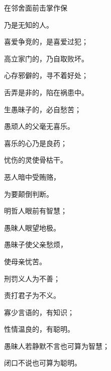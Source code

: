 {\par }{\Q {}在邻舍面前击掌作保
\par }{\Q 乃是无知的人。
\par }{\Q {}喜爱争竞的，是喜爱过犯；
\par }{\Q 高立家门的，乃自取败坏。
\par }{\Q {}心存邪僻的，寻不着好处；
\par }{\Q 舌弄是非的，陷在祸患中。
\par }{\Q {}生愚昧子的，必自愁苦；
\par }{\Q 愚顽人的父毫无喜乐。
\par }{\Q {}喜乐的心乃是良药；
\par }{\Q 忧伤的灵使骨枯干。
\par }{\Q {}恶人暗中受贿赂，
\par }{\Q 为要颠倒判断。
\par }{\Q {}明哲人眼前有智慧；
\par }{\Q 愚昧人眼望地极。
\par }{\Q {}愚昧子使父亲愁烦，
\par }{\Q 使母亲忧苦。
\par }{\Q {}刑罚义人为不善；
\par }{\Q 责打君子为不义。
\par }{\Q {}寡少言语的，有知识；
\par }{\Q 性情温良的，有聪明。
\par }{\Q {}愚昧人若静默不言也可算为智慧；
\par }{\Q 闭口不说也可算为聪明。

}
